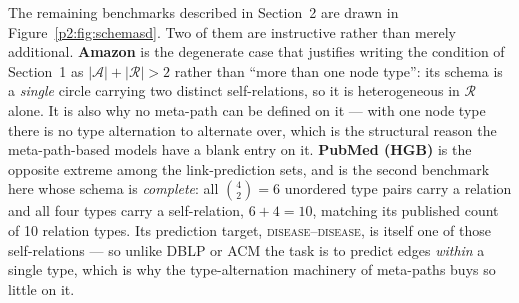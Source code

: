 The remaining benchmarks described in Section~2 are drawn in Figure~\ref{p2:fig:schemasd}. Two of
them are instructive rather than merely additional. \textbf{Amazon} is the degenerate case that
justifies writing the condition of Section~1 as $|\mathcal{A}|+|\mathcal{R}|>2$ rather than
``more than one node type'': its schema is a \emph{single} circle carrying two distinct
self-relations, so it is heterogeneous in $\mathcal{R}$ alone. It is also why no meta-path can be
defined on it --- with one node type there is no type alternation to alternate over, which is the
structural reason the meta-path-based models have a blank entry on it. \textbf{PubMed (HGB)} is
the opposite extreme among the link-prediction sets, and is the second benchmark here whose
schema is \emph{complete}: all $\binom{4}{2}=6$ unordered type pairs carry a relation and all
four types carry a self-relation, $6+4=10$, matching its published count of 10 relation types.
Its prediction target, \textsc{disease}--\textsc{disease}, is itself one of those
self-relations --- so unlike DBLP or ACM the task is to predict edges \emph{within} a single
type, which is why the type-alternation machinery of meta-paths buys so little on it.

